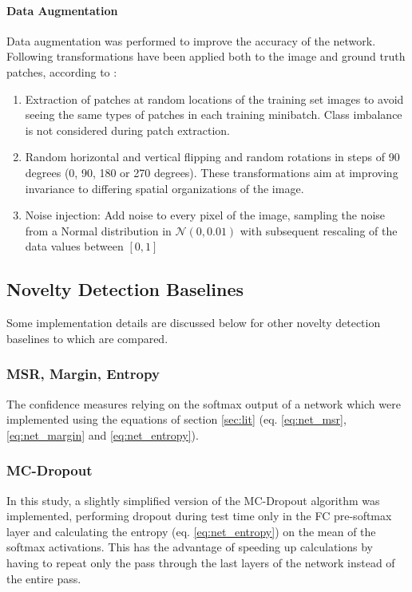 \documentclass[10pt]{article}
\begin{document}
\paragraph{Data Augmentation} Data augmentation was performed to improve the accuracy of the network. Following transformations have been applied both to the image and ground truth patches, according to \textcite{Volpi2017DenseSL}:
\begin{enumerate}
    \item Extraction of patches at random locations of the training set images to avoid seeing the same types of patches in each training minibatch. Class imbalance is not considered during patch extraction.
    \item Random horizontal and vertical flipping and random rotations in steps of 90 degrees (0, 90, 180 or 270 degrees). These transformations aim at improving invariance to differing spatial organizations of the image.
    \item Noise injection: Add noise to every pixel of the image, sampling the noise from a Normal distribution in $\mathcal{N}(0, 0.01)$ with subsequent rescaling of the data values between $[0, 1]$
\end{enumerate}

\subsection{Novelty Detection Baselines}
Some implementation details are discussed below for other novelty detection baselines to which  are compared. 

\subsubsection{MSR, Margin, Entropy} 
The confidence measures relying on the softmax output of a network which were implemented using the equations of section \ref{sec:lit} (eq. \ref{eq:net_msr}, \ref{eq:net_margin} and \ref{eq:net_entropy}).

\subsubsection{MC-Dropout} 
In this study, a slightly simplified version of the \gls{MC-Dropout} algorithm was implemented, performing dropout during test time only in the \gls{FC} pre-softmax layer and calculating the entropy (eq. \ref{eq:net_entropy}) on the mean of the softmax activations. This has the advantage of speeding up calculations by having to repeat only the pass through the last layers of the network instead of the entire pass.
\end{document}
